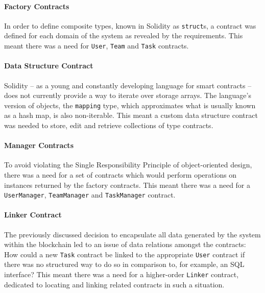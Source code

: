 \paragraph{Factory Contracts}\label{factory-contracts}

In order to define composite types, known in Solidity as
\texttt{struct}s, a contract was defined for each domain of the system
as revealed by the requirements. This meant there was a need for
\texttt{User}, \texttt{Team} and \texttt{Task} contracts.

\paragraph{Data Structure Contract}\label{data-structure-contract}

Solidity -- as a young and constantly developing language for smart
contracts -- does not currently provide a way to iterate over storage
arrays. The language's version of objects, the \texttt{mapping} type,
which approximates what is usually known as a hash map, is also
non-iterable. This meant a custom data structure contract was needed to
store, edit and retrieve collections of type contracts.

\paragraph{Manager Contracts}\label{manager-contracts}

To avoid violating the Single Responsibility
Principle\cite{martin2003agile} of object-oriented design, there was a
need for a set of contracts which would perform operations on instances
returned by the factory contracts. This meant there was a need for a
\texttt{UserManager}, \texttt{TeamManager} and \texttt{TaskManager}
contract.

\paragraph{Linker Contract}\label{linker-contract}

The previously discussed decision to encapsulate all data generated by
the system within the blockchain led to an issue of data relations
amongst the contracts: How could a new \texttt{Task} contract be linked
to the appropriate \texttt{User} contract if there was no structured way
to do so in comparison to, for example, an SQL interface? This meant
there was a need for a higher-order \texttt{Linker} contract, dedicated
to locating and linking related contracts in such a situation.

